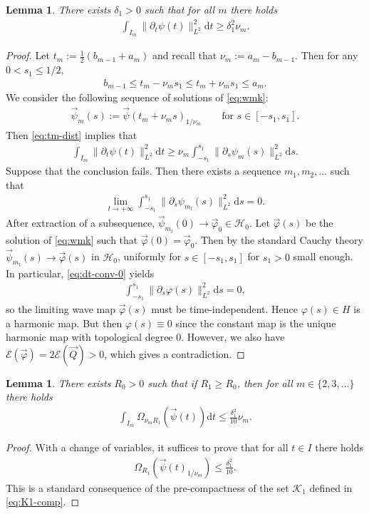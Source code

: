 \documentclass[10pt,reqno]{amsart}
\def\cK {\mathcal{K}}
\newcommand{\E}{\mathcal{E}}
\newcommand{\HH}{\mathcal{H}}
\newcommand{\fy}{\varphi}
\newcommand{\EQ}[1]{\begin{equation}\begin{split} #1 \end{split}\end{equation}}
\numberwithin{equation}{section}
\newtheorem{lem}[thm]{Lemma}
\theoremstyle{remark}
\newcommand{\ud}{\mathrm{d}}
\newcommand{\0}{\emptyset}
\begin{document}
\begin{lem}\label{l:comp-vm}
There exists $\delta_1 > 0$ such that for all $m$ there holds
\EQ{
\int_{I_m} \|\partial_t \psi(t)\|_{L^2}^2\ud t \geq \delta_1^2 \nu_m.
}
\end{lem}
\begin{proof}
Let $t_m := \frac 12(b_{m-1} + a_m)$ and recall that $\nu_m := a_m - b_{m-1}$.  %
Then for any $0<s_1 \le 1/2$, %
\EQ{
b_{m-1} \le  t_m - \nu_m s_1  \leq t_m + \nu_m s_1  \le   a_m. \label{eq:tm-dist}
}
We consider the following sequence of solutions of \eqref{eq:wmk}:
\EQ{
\vec \psi_m(s) := \vec\psi(t_m + \nu_m s)_{1/\nu_m}\qquad \text{for }s \in [-s_1, s_1].
}
Then \eqref{eq:tm-dist} implies that
\EQ{
\int_{I_m} \|\partial_t \psi(t)\|_{L^2}^2\ud t \geq \nu_m \int_{-s_1}^{s_1} \|\partial_s \psi_m(s)\|_{L^2}^2\ud s.
}
Suppose that the conclusion fails. Then there exists a sequence $m_1, m_2, \ldots$ such that
\EQ{
\lim_{l\to+\infty}\int_{-s_1}^{s_1}\|\partial_s \psi_{m_l}(s)\|_{L^2}^2\ud s = 0. \label{eq:dt-conv-0}
}
After extraction of a subsequence, $\vec \psi_{m_l}(0) \to \vec\fy_0 \in \HH_0$.
Let $\vec\fy(s)$ be the solution of \eqref{eq:wmk}
such that $\vec\fy(0) = \vec\fy_0$. Then by the standard Cauchy theory $\vec\psi_{m_l}(s) \to \vec\fy(s)$
in $\HH_0$, uniformly for $s \in [-s_1, s_1]$ for $s_1>0$ small enough.
In particular, \eqref{eq:dt-conv-0} yields
\EQ{
\int_{-s_1}^{s_1}\|\partial_s \fy(s)\|_{L^2}^2\ud s = 0,
}
so the limiting wave map $\vec \fy(s)$ must be time-independent.
Hence $\fy(s) \in H$ is a harmonic map. But then $\fy(s) \equiv 0$ since the constant map is the unique harmonic map with topological degree $0$. However, we also have $\E(\vec \fy) = 2 \E(\vec Q) >0$, which gives a contradiction. 
\end{proof}

\begin{lem}\label{l:err-on-I}
There exists $R_0 > 0$ such that if $R_1 \geq R_0$, then for all $m \in \{2, 3, \ldots\}$ there holds
\EQ{
\int_{I_m}\Omega_{\nu_m R_1}(\vec\psi(t))\ud t \leq \frac{\delta_1^2}{10}\nu_m.
}
\end{lem}
\begin{proof}
With a change of variables, it suffices to prove that for all $t \in I$ there holds
\EQ{
\Omega_{R_1}(\vec\psi(t)_{1/\nu_m}) \leq \frac{\delta_1^2}{10}.
}
This is a standard consequence of the pre-compactness of the set $\cK_1$ defined in \eqref{eq:K1-comp}.
\end{proof}
\end{document}

